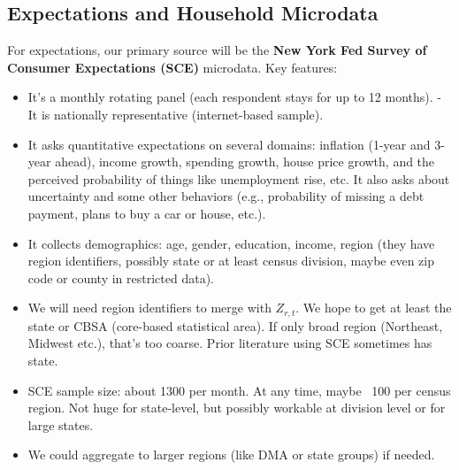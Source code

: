 \documentclass[12pt]{article}
\begin{document}
\subsection*{Expectations and Household Microdata}
For expectations, our primary source will be the \textbf{New York Fed Survey of Consumer Expectations (SCE)} microdata. Key features:
\begin{itemize}
    \item It's a monthly rotating panel (each respondent stays for up to 12 months). - It is nationally representative (internet-based sample).
    \item It asks quantitative expectations on several domains: inflation (1-year and 3-year ahead), income growth, spending growth, house price growth, and the perceived probability of things like unemployment rise, etc. It also asks about uncertainty and some other behaviors (e.g., probability of missing a debt payment, plans to buy a car or house, etc.).
    \item It collects demographics: age, gender, education, income, region (they have region identifiers, possibly state or at least census division, maybe even zip code or county in restricted data).
    \item We will need region identifiers to merge with $Z_{r,t}$. We hope to get at least the state or CBSA (core-based statistical area). If only broad region (Northeast, Midwest etc.), that's too coarse. Prior literature using SCE sometimes has state.
    \item SCE sample size: about 1300 per month. At any time, maybe ~100 per census region. Not huge for state-level, but possibly workable at division level or for large states.
    \item We could aggregate to larger regions (like DMA or state groups) if needed.
\end{itemize}
\end{document}
